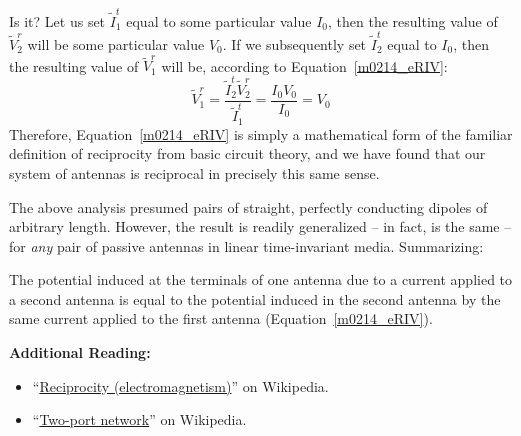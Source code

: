 Is it?
Let us set $\widetilde{I}_1^t$ equal to some particular value $I_0$, then the resulting value of $\widetilde{V}_2^r$ will be some particular value $V_0$.
If we subsequently set $\widetilde{I}_2^t$ equal to $I_0$, then the resulting value of $\widetilde{V}_1^r$ will be, according to Equation~\ref{m0214_eRIV}:
%
\begin{equation}
\widetilde{V}_1^r
= \frac{ \widetilde{I}_2^t \widetilde{V}_2^r }{ \widetilde{I}_1^t }
= \frac{ I_0 V_0 }{ I_0 } 
= V_0
\end{equation}
%
Therefore, Equation~\ref{m0214_eRIV} is simply a mathematical form of the familiar definition of reciprocity from basic circuit theory,
and we have found that our system of antennas is reciprocal in precisely this same sense.

The above analysis presumed pairs of straight, perfectly conducting dipoles of arbitrary length.
However, the result is readily generalized -- in fact, is the same -- for \emph{any} pair of passive antennas in linear time-invariant media.
Summarizing:
%
\begin{mdframed}[backgroundcolor=yellow!20,nobreak=true] 
The potential induced at the terminals of one antenna due to a current applied to a second antenna is equal to the potential induced in the second antenna by the same current applied to the first antenna (Equation~\ref{m0214_eRIV}).
\end{mdframed}


{\bf Additional Reading:}
\begin{itemize}
\item ``\href{https://en.wikipedia.org/wiki/Reciprocity_(electromagnetism)}{Reciprocity (electromagnetism)}'' on Wikipedia.
\item ``\href{https://en.wikipedia.org/wiki/Two-port_network}{Two-port network}'' on Wikipedia.
\end{itemize}


